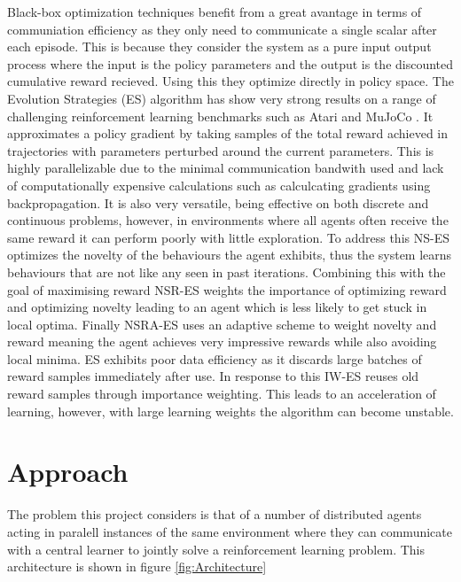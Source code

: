 Black-box optimization techniques benefit from a great avantage in terms of communiation efficiency as they only need to communicate a single scalar after each episode. This is because they consider the system as a pure input output process where the input is the policy parameters and the output is the discounted cumulative reward recieved. Using this they optimize directly in policy space.
The Evolution Strategies (ES) \cite{ES} algorithm has show very strong results on a range of challenging reinforcement learning benchmarks such as Atari \cite{Atari} and MuJoCo \cite{MuJoCo}. It approximates a policy gradient by taking samples of the total reward achieved in trajectories with parameters perturbed around the current parameters. This is highly parallelizable due to the minimal communication bandwith used and lack of computationally expensive calculations such as calculcating gradients using backpropagation. It is also very versatile, being effective on both discrete and continuous problems, however, in environments where all agents often receive the same reward it can perform poorly with little exploration. 
To address this NS-ES \cite{NS-ES} optimizes the novelty of the behaviours the agent exhibits, thus the system learns behaviours that are not like any seen in past iterations. Combining this with the goal of maximising reward NSR-ES weights the importance of optimizing reward and optimizing novelty leading to an agent which is less likely to get stuck in local optima. Finally NSRA-ES uses an adaptive scheme to weight novelty and reward meaning the agent achieves very impressive rewards while also avoiding local minima.
ES exhibits poor data efficiency as it discards large batches of reward samples immediately after use. In response to this IW-ES \cite{IWES} reuses old reward samples through importance weighting. This leads to an acceleration of learning, however, with large learning weights the algorithm can become unstable.



\section{Approach}
The problem this project considers is that of a number of distributed agents acting in paralell instances of the same environment where they can communicate with a central learner to jointly solve a reinforcement learning problem. 
This architecture is shown in figure \ref{fig:Architecture}

